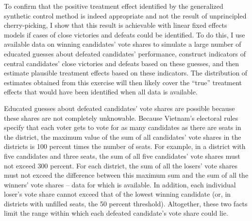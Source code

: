 \documentclass[12pt]{article}
\newcommand{\1}{\mathbbm{1}}
\begin{document}
To confirm that the positive treatment effect identified by the generalized synthetic control method \citep{Xu2017gsynth} is indeed appropriate and not the result of unprincipled cherry-picking, I show that this result is achievable with linear fixed effects models if cases of close victories and defeats could be identified. To do this, I use available data on winning candidates' vote shares to simulate a large number of educated guesses about defeated candidates' performance, construct indicators of central candidates' close victories and defeats based on these guesses, and then estimate plausible treatment effects based on these indicators. The distribution of estimates obtained from this exercise will then likely cover the ``true'' treatment effects that would have been identified when all data is available.

Educated guesses about defeated candidates' vote shares are possible because these shares are not completely unknowable. Because Vietnam's electoral rules specify that each voter gets to vote for as many candidates as there are seats in the district, the maximum value of the sum of all candidates' vote shares in the districts is 100 percent times the number of seats. For example, in a district with five candidates and three seats, the sum of all five candidates' vote shares must not exceed 300 percent. For each district, the sum of all the losers' vote shares must not exceed the difference between this maximum sum and the sum of all the winners' vote shares -- data for which is available. In addition, each individual loser's vote share cannot exceed that of the lowest winning candidate (or, in districts with unfilled seats, the 50 percent threshold). Altogether, these two facts limit the range within which each defeated candidate's vote share could lie.
\end{document}
